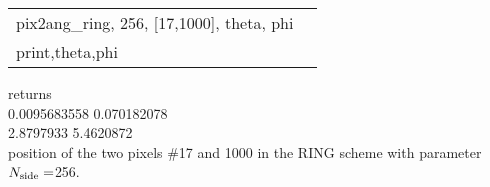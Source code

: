 \begin{example}
{
\begin{tabular}{ll} %
pix2ang\_ring, 256, [17,1000], theta, phi \\
print,theta,phi
\end{tabular}
}
{
\begin{minipage}{11cm}
returns  \\
    0.0095683558  \hskip 1cm   0.070182078 \\
       2.8797933  \hskip 1cm         5.4620872 \\
position of the two pixels \#17 and 1000 in the RING scheme with parameter $N_{\mathrm{side}}=$256.
\end{minipage}
}
\end{example}


